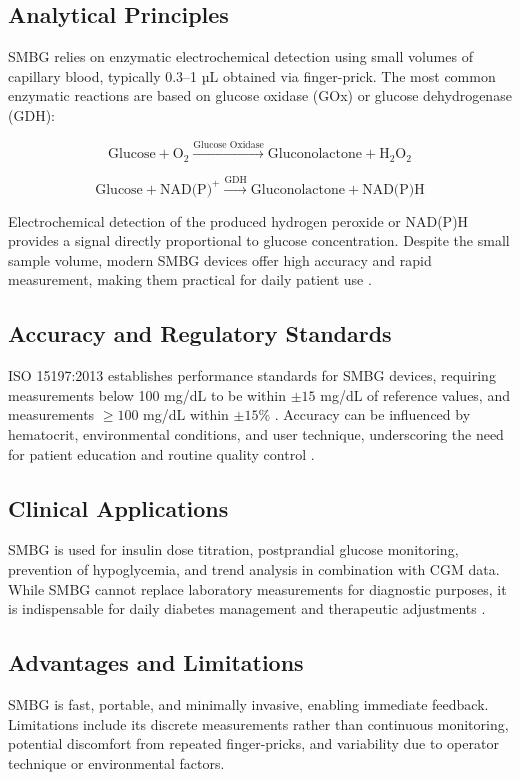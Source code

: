 \documentclass[12pt,a4paper]{article}
\begin{document}
\subsection{Analytical Principles}
SMBG relies on enzymatic electrochemical detection using small volumes of capillary blood, typically 0.3–1 µL obtained via finger-prick. The most common enzymatic reactions are based on glucose oxidase (GOx) or glucose dehydrogenase (GDH):

\[
\text{Glucose} + \text{O}_2 \xrightarrow{\text{Glucose Oxidase}} \text{Gluconolactone} + \text{H}_2\text{O}_2
\]

\[
\text{Glucose} + \text{NAD(P)}^+ \xrightarrow{\text{GDH}} \text{Gluconolactone} + \text{NAD(P)H}
\]

Electrochemical detection of the produced hydrogen peroxide or NAD(P)H provides a signal directly proportional to glucose concentration. Despite the small sample volume, modern SMBG devices offer high accuracy and rapid measurement, making them practical for daily patient use \cite{Heinemann2018}.

\subsection{Accuracy and Regulatory Standards}
ISO 15197:2013 establishes performance standards for SMBG devices, requiring measurements below 100 mg/dL to be within $\pm 15$ mg/dL of reference values, and measurements $\geq 100$ mg/dL within $\pm 15\%$ \cite{ISO15197}. Accuracy can be influenced by hematocrit, environmental conditions, and user technique, underscoring the need for patient education and routine quality control \cite{Heinemann2018}.

\subsection{Clinical Applications}
SMBG is used for insulin dose titration, postprandial glucose monitoring, prevention of hypoglycemia, and trend analysis in combination with CGM data. While SMBG cannot replace laboratory measurements for diagnostic purposes, it is indispensable for daily diabetes management and therapeutic adjustments \cite{ADA2025}.

\subsection{Advantages and Limitations}
SMBG is fast, portable, and minimally invasive, enabling immediate feedback. Limitations include its discrete measurements rather than continuous monitoring, potential discomfort from repeated finger-pricks, and variability due to operator technique or environmental factors.
\end{document}
